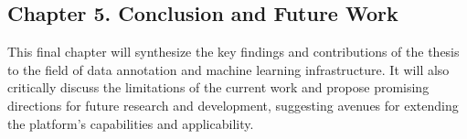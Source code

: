 \subsection*{Chapter 5. Conclusion and Future Work}
 This final chapter will synthesize the key findings and contributions of the thesis to the field of data annotation and machine learning infrastructure. It will also critically discuss the limitations of the current work and propose promising directions for future research and development, suggesting avenues for extending the platform's capabilities and applicability.